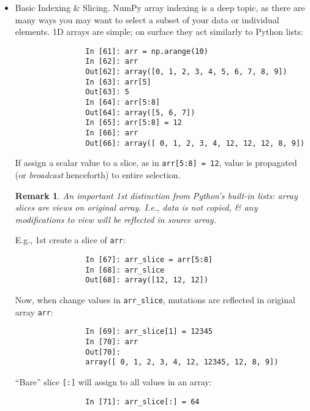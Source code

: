 \documentclass{article}
\newtheorem{remark}{Remark}
\begin{document}
\begin{itemize}
\begin{itemize}
\begin{itemize}
\begin{verbatim}
				
				In [57]: arr ** 2
				Out[57]:
				array([[ 1., 4., 9.],
				[16., 25., 36.]])
			\end{verbatim}
			Comparisons between arrays of same size yield Boolean arrays:
			\begin{verbatim}
				In [58]: arr2 = np.array([[0., 4., 1.], [7., 2., 12.]])
				In [59]: arr2
				Out[59]:
				array([[ 0., 4., 1.],
				[ 7., 2., 12.]])
				In [60]: arr2 > arr
				Out[60]:
				array([[False, True, False],
				[ True, False, True]])
			\end{verbatim}
			Evaluating operations between differently sized arrays is called {\it broadcasting} (see Appendix A). Having a deep understanding of broadcasting is not necessary for most of this book.
			\item {\sf Basic Indexing \& Slicing.} NumPy array indexing is a deep topic, as there are many ways you may want to select a subset of your data or individual elements. 1D arrays are simple; on surface they act similarly to Python lists:
			\begin{verbatim}
				In [61]: arr = np.arange(10)
				In [62]: arr
				Out[62]: array([0, 1, 2, 3, 4, 5, 6, 7, 8, 9])
				In [63]: arr[5]
				Out[63]: 5
				In [64]: arr[5:8]
				Out[64]: array([5, 6, 7])
				In [65]: arr[5:8] = 12
				In [66]: arr
				Out[66]: array([ 0, 1, 2, 3, 4, 12, 12, 12, 8, 9])	
			\end{verbatim}
			If assign a scalar value to a slice, as in {\tt arr[5:8] = 12}, value is propagated (or {\it broadcast} henceforth) to entire selection.
			\begin{remark}
				An important 1st distinction from Python's built-in lists: array slices are views on original array. I.e., data is not copied, \& any modifications to view will be reflected in source array.
			\end{remark}
			E.g., 1st create a slice of {\tt arr}:
			\begin{verbatim}
				In [67]: arr_slice = arr[5:8]
				In [68]: arr_slice
				Out[68]: array([12, 12, 12])
			\end{verbatim}
			Now, when change values in \verb|arr_slice|, mutations are reflected in original array {\tt arr}:
			\begin{verbatim}
				In [69]: arr_slice[1] = 12345
				In [70]: arr
				Out[70]:
				array([ 0, 1, 2, 3, 4, 12, 12345, 12, 8, 9])
			\end{verbatim}
			``Bare'' slice {\tt[:]} will assign to all values in an array:
			\begin{verbatim}
				In [71]: arr_slice[:] = 64

\end{verbatim}
\end{itemize}
\end{itemize}
\end{itemize}
\end{document}
